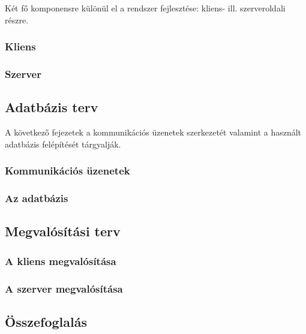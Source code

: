 Két fő komponensre különül el a rendszer fejlesztése: kliens-
ill. szerveroldali részre.

\subsubsection{Kliens}
\label{sec:kliensinterfesz}

\subsubsection{Szerver}
\label{sec:szerverinterfesz}

\subsection{Adatbázis terv}

A következő fejezetek a kommunikációs üzenetek szerkezetét valamint a használt adatbázis felépítését tárgyalják.


\subsubsection{Kommunikációs üzenetek}
\label{sec:kommuzenetek}

\subsubsection{Az adatbázis}
\label{sec:adatb}

\subsection{Megvalósítási terv}
\label{sec:megvalositas}

\subsubsection{A kliens megvalósítása}

\subsubsection{A szerver megvalósítása}
\label{sec:szervermegvalositas}


\subsection{Összefoglalás}

